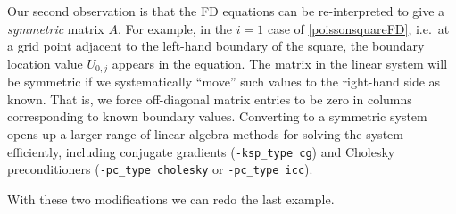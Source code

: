 Our second observation is that the FD equations can be re-interpreted to give a \emph{symmetric} matrix $A$.  For example, in the $i=1$ case of \eqref{poissonsquareFD}, i.e.~at a grid point adjacent to the left-hand boundary of the square, the boundary location value $U_{0,j}$ appears in the equation.  The matrix in the linear system will be symmetric if we systematically ``move'' such values to the right-hand side as known.  That is, we force off-diagonal matrix entries to be zero in columns corresponding to known boundary values.  Converting to a symmetric system opens up a larger range of linear algebra methods for solving the system efficiently, including conjugate gradients (\texttt{-ksp\_type cg}) and Cholesky preconditioners (\texttt{-pc\_type cholesky} or \texttt{-pc\_type icc}).

With these two modifications we can redo the last example.

